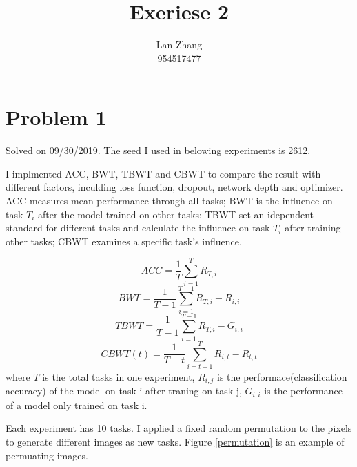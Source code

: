 \documentclass{article}
\title{Exeriese 2}
\author{%
  Lan Zhang\\
  954517477\\
}
\begin{document}
\maketitle

\section{Problem 1}

Solved on 09/30/2019. The seed I used in belowing experiments is 2612. 

I implmented ACC, BWT, TBWT and CBWT to compare the result with different factors, inculding loss function, dropout, network depth and optimizer. ACC measures mean performance through all tasks; BWT is the influence on task $T_i$ after the model trained on other tasks; TBWT set an idependent standard for different tasks and calculate the influence on task $T_i$ after training other tasks; CBWT examines a specific task's influence.

$$ACC = \frac{1}{T}\sum_{i=1}^TR_{T,i}$$
$$BWT = \frac{1}{T-1}\sum_{i=1}^{T-1}R_{T,i}-R_{i,i}$$
$$TBWT = \frac{1}{T-1}\sum_{i=1}^{T-1}R_{T,i}-G_{i,i}$$
$$CBWT(t) = \frac{1}{T-t}\sum_{i=t+1}^{T}R_{i,t}-R_{t,t}$$
where $T$ is the total tasks in one experiment, $R_{i, j}$ is the performace(classification accuracy) of the model on task i after traning on task j, $G_{i, i}$ is the performance of a model only trained on task i.

Each experiment has 10 tasks. I applied a fixed random permutation to the pixels to generate different images as new tasks. Figure \ref{permutation} is an example of permuating images.  
\end{document}
